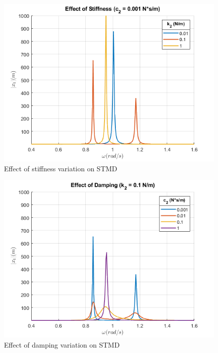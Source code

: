 \begin{figure}[ht]
    \centerfloat
    \includegraphics[scale = 0.5]{MATLAB Figures/Effect of Stiffness linear.png}
    \caption{Effect of stiffness variation on STMD}
    \label{fig:effect_of_stiffness}
\end{figure}
\begin{figure}[ht!]
    \centerfloat
    \includegraphics[scale = 0.5]{MATLAB Figures/Effect of Damping linear.png}
    \caption{Effect of damping variation on STMD}
    \label{fig:effect_of_damping}
\end{figure}
